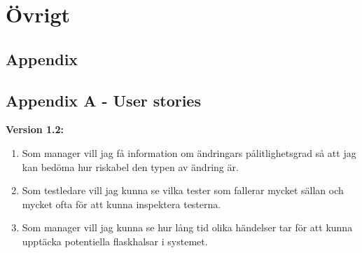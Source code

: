 \newpage
\section{Övrigt}
\subsection{Appendix}
\subsection*{Appendix A - User stories}
\textbf{Version 1.2:}
\begin{enumerate}
\item Som manager vill jag få information om ändringars pålitlighetsgrad så att jag kan bedöma hur riskabel den typen av ändring är. 
\item Som testledare vill jag kunna se vilka tester som fallerar mycket sällan och mycket ofta för att kunna inspektera testerna.
\item Som manager vill jag kunna se hur lång tid olika händelser tar för att kunna upptäcka potentiella flaskhalsar i systemet.
\end{enumerate}
